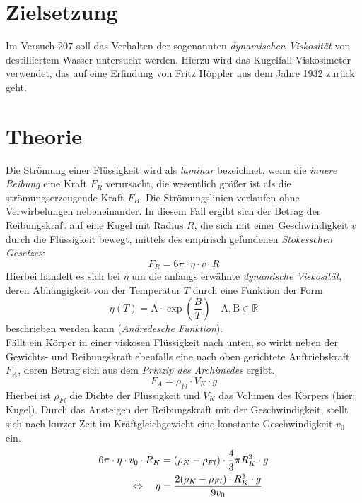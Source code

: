 \section*{Zielsetzung}
Im Versuch $207$ soll das Verhalten der sogenannten \emph{dynamischen Viskosität} von destilliertem Wasser untersucht werden. Hierzu wird das Kugelfall-Viskosimeter verwendet,
das auf eine Erfindung von Fritz Höppler aus dem Jahre 1932 zurück geht.

\section{Theorie}
Die Strömung einer Flüssigkeit wird als \emph{laminar} bezeichnet, wenn die \emph{innere Reibung} eine Kraft $F_R$ verursacht, die wesentlich größer ist
als die strömungserzeugende Kraft $F_B$. Die Strömungslinien verlaufen ohne Verwirbelungen nebeneinander.
In diesem Fall ergibt sich der Betrag der Reibungskraft auf eine Kugel mit Radius $R$, die sich mit einer Geschwindigkeit
$v$ durch die Flüssigkeit bewegt, mittels des empirisch gefundenen \emph{Stokesschen Gesetzes}:
\begin{equation}
  F_R = 6 \pi \cdot \eta \cdot v \cdot R
  \label{eq: stokes}
\end{equation}
Hierbei handelt es sich bei $\eta$ um die anfangs erwähnte \emph{dynamische Viskosität}, deren Abhängigkeit von der Temperatur $T$ durch eine Funktion der Form
\begin{equation}
  \eta(T) = \mathup{A} \cdot \exp\left(\frac{B}{T}\right) \quad \mathup{A}, \mathup{B} \in \mathbb{R}
  \label{eq: andrad}
\end{equation}
beschrieben werden kann (\emph{Andredesche Funktion}). \\
Fällt ein Körper in einer viskosen Flüssigkeit nach unten, so wirkt neben der Gewichts- und Reibungskraft ebenfalls eine nach oben gerichtete Auftriebskraft $F_A$, deren
Betrag sich aus dem \emph{Prinzip des Archimedes} ergibt.
\begin{equation}
  F_A = \rho_{Fl} \cdot V_K \cdot g
\end{equation}
Hierbei ist $\rho_{Fl}$ die Dichte der Flüssigkeit und $V_K$ das Volumen des Körpers (hier: Kugel). Durch das Ansteigen der Reibungskraft mit der Geschwindigkeit,
stellt sich nach kurzer Zeit im Kräftgleichgewicht eine konstante Geschwindigkeit $v_0$ ein.
\begin{align}
  \begin{aligned}
  6 \pi \cdot \eta \cdot v_0 \cdot R_K  &= (\rho_K - \rho_{Fl}) \cdot \frac{4}{3}\pi R_K^3 \cdot g  \\
  \hfill
  \Leftrightarrow \quad \eta &= \frac{2 (\rho_K - \rho_{Fl}) \cdot R_K^2 \cdot  g}{9 v_0}
\end{aligned}
\end{align}
